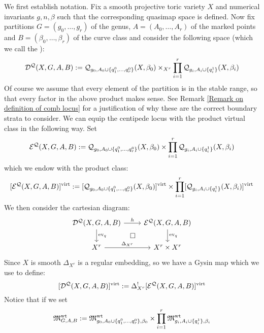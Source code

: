We first establish notation. Fix a smooth projective toric variety $X$ and numerical invariants $g,n,\beta$ such that the corresponding quasimap space is defined. Now fix partitions $G=(g_0,\ldots,g_r)$ of the genus, $A=(A_0,\ldots,A_r)$ of the marked points and $B=(\beta_0, \ldots, \beta_r)$ of the curve class and consider the following space (which we call the ):
\begin{equation*} \mathcal{D^Q}(X,G,A,B) := \mathcal{Q}_{g_0,A_0 \cup \{ q_1^0, \ldots, q_r^0 \}}(X,\beta_0) \times_{X^r} \prod_{i=1}^r \mathcal{Q}_{g_i,A_i\cup\{q_i^1 \}}(X,\beta_i) \end{equation*}
Of course we assume that every element of the partition is in the stable range, so that every factor in the above product makes sense. See Remark \ref{Remark on definition of comb locus} for a justification of why these are the correct boundary strata to consider. We can equip the centipede locus with the product virtual class in the following way. Set
\begin{equation*} \mathcal{E^Q}(X,G,A,B) :=  \mathcal{Q}_{g_0,A_0 \cup \{ q_1^0, \ldots, q_r^0 \}}(X,\beta_0) \times \prod_{i=1}^r \mathcal{Q}_{g_i,A_i\cup\{q_i^1\}}(X,\beta_i) \end{equation*}
which we endow with the product class:
\begin{equation*} [\mathcal{E^Q}(X,G,A,B)]^{\operatorname{virt}} := [\mathcal{Q}_{g_0,A_0 \cup \{ q_1^0, \ldots, q_r^0 \}}(X,\beta_0)]^{\operatorname{virt}} \times \prod_{i=1}^r [\mathcal{Q}_{g_i,A_i\cup\{q_i^1\}}(X,\beta_i)]^{\operatorname{virt}} \end{equation*}
We then consider the cartesian diagram:
\begin{equation} \label{Product diagram}
\begin{tikzcd}
\D{X}{G,A}{B} \ar[r,"h"] \ar[d,"\ev_q"] \ar[rd,phantom,"\square"] & \E{X}{G,A}{B} \ar[d,"\ev_q"] \\
X^r \ar[r,"\Delta_{X^r}"] & X^r \times X^r
\end{tikzcd}
\end{equation}
Since $X$ is smooth $\Delta_{X^r}$ is a regular embedding, so we have a Gysin map which we use to define:
\begin{equation*} [\mathcal{D^Q}(X,G,A,B)]^{\operatorname{virt}} := \Delta_{X^r}^! [\mathcal{E^Q}(X,G,A,B)]^{\operatorname{virt}} \end{equation*}
Notice that if we set
\begin{equation*} \mathfrak M_{G,A,B}^{\operatorname{wt}} := \mathfrak M_{g_0,A_0\cup\{q_1^0,\ldots,q_r^0\},\beta_0}^{\operatorname{wt}} \times \prod_{i=1}^r \mathfrak M_{g_i,A_i\cup\{q_i^1\},\beta_i}^{\operatorname{wt}} \end{equation*}
